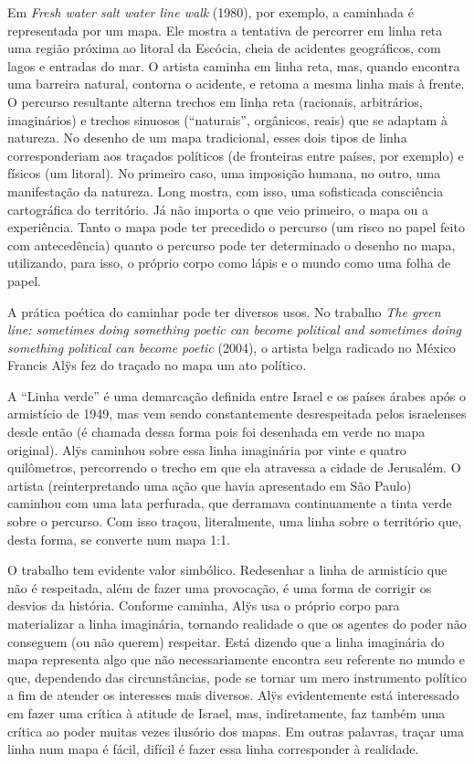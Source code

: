 Em \emph{Fresh water salt water line walk} (1980), por exemplo, a
caminhada é representada por um mapa. Ele mostra a tentativa de
percorrer em linha reta uma região próxima ao litoral da Escócia, cheia
de acidentes geográficos, com lagos e entradas do mar. O artista caminha
em linha reta, mas, quando encontra uma barreira natural, contorna o
acidente, e retoma a mesma linha mais à frente. O percurso resultante
alterna trechos em linha reta (racionais, arbitrários, imaginários) e
trechos sinuosos (``naturais'', orgânicos, reais) que se adaptam à
natureza. No desenho de um mapa tradicional, esses dois tipos de linha
corresponderiam aos traçados políticos (de fronteiras entre países, por
exemplo) e físicos (um litoral). No primeiro caso, uma imposição humana,
no outro, uma manifestação da natureza. Long mostra, com isso, uma
sofisticada consciência cartográfica do território. Já não importa o que
veio primeiro, o mapa ou a experiência. Tanto o mapa pode ter precedido
o percurso (um risco no papel feito com antecedência) quanto o percurso
pode ter determinado o desenho no mapa, utilizando, para isso, o próprio
corpo como lápis e o mundo como uma folha de papel.

A prática poética do caminhar pode ter diversos usos. No trabalho
\emph{The green line: sometimes doing something poetic can become
political and sometimes doing something political can become poetic}
(2004), o artista belga radicado no México Francis Alÿs fez do traçado
no mapa um ato político.

A ``Linha verde'' é uma demarcação definida entre Israel e os países
árabes após o armistício de 1949, mas vem sendo constantemente
desrespeitada pelos israelenses desde então (é chamada dessa forma pois
foi desenhada em verde no mapa original). Alÿs caminhou sobre essa linha
imaginária por vinte e quatro quilômetros, percorrendo o trecho em que
ela atravessa a cidade de Jerusalém. O artista (reinterpretando uma ação
que havia apresentado em São Paulo) caminhou com uma lata perfurada, que
derramava continuamente a tinta verde sobre o percurso. Com isso traçou,
literalmente, uma linha sobre o território que, desta forma, se converte
num mapa 1:1.

O trabalho tem evidente valor simbólico. Redesenhar a linha de
armistício que não é respeitada, além de fazer uma provocação, é uma
forma de corrigir os desvios da história. Conforme caminha, Alÿs usa o
próprio corpo para materializar a linha imaginária, tornando realidade o
que os agentes do poder não conseguem (ou não querem) respeitar. Está
dizendo que a linha imaginária do mapa representa algo que não
necessariamente encontra seu referente no mundo e que, dependendo das
circunstâncias, pode se tornar um mero instrumento político a fim de
atender os interesses mais diversos. Alÿs evidentemente está interessado
em fazer uma crítica à atitude de Israel, mas, indiretamente, faz também
uma crítica ao poder muitas vezes ilusório dos mapas. Em outras
palavras, traçar uma linha num mapa é fácil, difícil é fazer essa linha
corresponder à realidade.


